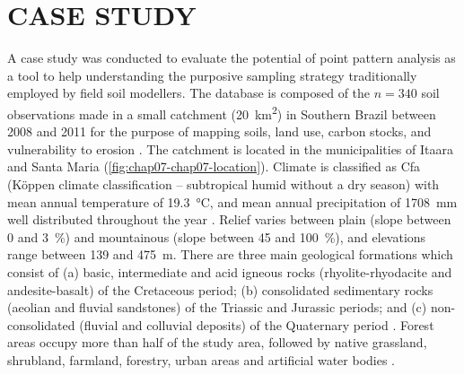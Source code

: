 \section{CASE STUDY}

A  case study was conducted to evaluate the potential of point pattern analysis as a tool to help 
understanding 
the purposive sampling strategy traditionally employed by field soil modellers. The database is composed of 
the $n = 340$ soil observations made in a small catchment (\SI{20}{\km\squared}) in Southern Brazil between 
\num{2008} and \num{2011} for the purpose of mapping soils, land use, carbon stocks, and vulnerability to 
erosion \cite{SamuelRosaEtAl2011a, MiguelEtAl2012, Samuel-RosaEtAl2013}. The catchment is 
located in the municipalities of Itaara and Santa Maria (\autoref{fig:chap07-chap07-location}). Climate is 
classified as Cfa (K{\"o}ppen climate classification -- subtropical humid without a dry season) with mean 
annual temperature of \SI{19.3}{\celsius}, and mean annual precipitation of \SI{1708}{\mm} well distributed 
throughout the year \cite{Maluf2000}. Relief varies between plain (slope between \num{0} and \SI{3}{\percent}) 
and mountainous (slope between \num{45} and \SI{100}{\percent}), and elevations range between \num{139} and 
\SI{475}{\m}. There are three main geological formations which consist of (a) basic, intermediate and acid 
igneous rocks (rhyolite-rhyodacite and andesite-basalt) of the Cretaceous period; (b) consolidated sedimentary 
rocks (aeolian and fluvial sandstones) of the Triassic and Jurassic periods; and (c) non-consolidated (fluvial 
and colluvial deposits) of the Quaternary period \cite{GasparettoEtAl1988, MacielFilho1990, Sartori2009}. 
Forest areas occupy more than half of the study area, followed by native grassland, shrubland, farmland, 
forestry, urban areas and artificial water bodies \cite{SamuelRosaEtAl2011a}.

